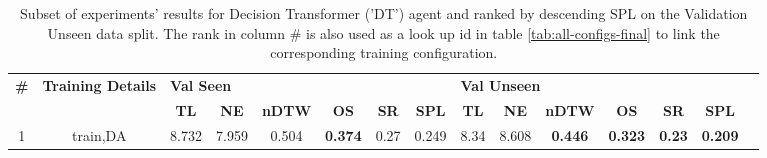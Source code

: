 \begin{table}
\centering
\caption{\label{tab:dt_dagger}Subset of experiments' results for Decision Transformer ('DT') agent and ranked by descending SPL on the Validation Unseen data split. The rank in column \# is also used as a look up id in table \ref{tab:all-configs-final} to link the corresponding training configuration.}
\begin{tabular}{@{\hskip3pt}c@{\hskip3pt}c@{\hskip3pt}c@{\hskip3pt}c@{\hskip3pt}c@{\hskip3pt}c@{\hskip3pt}c@{\hskip3pt}c@{\hskip3pt}c@{\hskip3pt}c@{\hskip3pt}c@{\hskip3pt}c@{\hskip3pt}c@{\hskip3pt}c@{\hskip3pt}c}
\toprule
\textbf{\#} & \textbf{Training Details} & \multicolumn{6}{l}{\textbf{Val Seen}} & \multicolumn{6}{l}{\textbf{Val Unseen}} \\
 \textbf{~} &                \textbf{~} &       \textbf{TL} & \textbf{NE} & \textbf{nDTW} &     \textbf{OS} & \textbf{SR} & \textbf{SPL} &         \textbf{TL} & \textbf{NE} &   \textbf{nDTW} &     \textbf{OS} &    \textbf{SR} &    \textbf{SPL} \\
\midrule
          1 &                  train,DA &             8.732 &       7.959 &         0.504 &  \textbf{0.374} &        0.27 &        0.249 &                8.34 &       8.608 &  \textbf{0.446} &  \textbf{0.323} &  \textbf{0.23} &  \textbf{0.209} \\
\bottomrule
\end{tabular}
\end{table}
